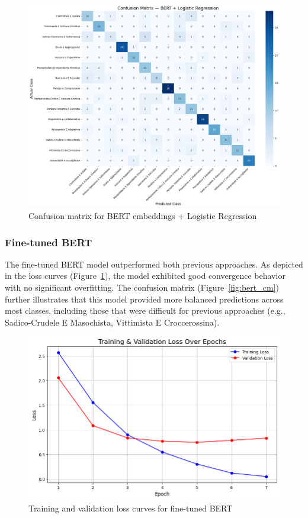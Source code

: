 \documentclass[conference]{IEEEtran}
\begin{document}
\begin{figure}[H]
  \centering
  \includegraphics[width=\columnwidth]{figures/bert_logreg_confusion_matrix.png}
  \caption{Confusion matrix for BERT embeddings + Logistic Regression}
\end{figure}

\vspace{1em}

\subsubsection{Fine-tuned BERT}
\noindent
The fine-tuned BERT model outperformed both previous approaches. As depicted in the loss curves (Figure~\ref{fig:bert_loss}), the model exhibited good convergence behavior with no significant overfitting. The confusion matrix (Figure~\ref{fig:bert_cm}) further illustrates that this model provided more balanced predictions across most classes, including those that were difficult for previous approaches (e.g., Sadico-Crudele E Masochista, Vittimista E Croccerossina).

\begin{figure}[H]
  \centering
  \includegraphics[width=\columnwidth]{figures/bert_finetuned_loss_curves.png}
  \caption{Training and validation loss curves for fine-tuned BERT}
  \label{fig:bert_loss}
\end{figure}
\end{document}
